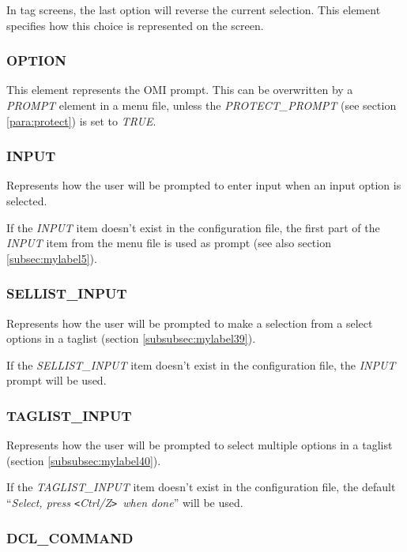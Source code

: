 \documentclass[a4paper]{book}
\newcommand{\lt}{\texttt{<}}
\newcommand{\gt}{\texttt{>}}
\begin{document}
In tag screens, the last option will reverse the current selection. This 
element specifies how this choice is represented on the screen.

\subsubsection{OPTION}
\label{para:option}

This element represents the OMI prompt. This can be overwritten by a 
\textsl{PROMPT} element in a menu file, unless the \textsl{PROTECT{\_}PROMPT} (see section 
\ref{para:protect}) is set to \textsl{TRUE}.

\subsubsection{INPUT}
\label{para:input}

Represents how the user will be prompted to enter input when an input option 
is selected.

If the \textsl{INPUT} item doesn't exist in the configuration file, the first part of the \textsl{INPUT}
item from the menu file is used as prompt (see also section \ref{subsec:mylabel5}).

\subsubsection{SELLIST{\_}INPUT}
\label{para:sellistinput}

Represents how the user will be prompted to make a selection from a select options in a taglist (section \ref{subsubsec:mylabel39}).

If the \textsl{SELLIST{\_}INPUT} item doesn't exist in the configuration file, the \textsl{INPUT} prompt will be used.

\subsubsection{TAGLIST{\_}INPUT}
\label{para:taglistinput}

Represents how the user will be prompted to select multiple options in a taglist (section \ref{subsubsec:mylabel40}).

If the \textsl{TAGLIST{\_}INPUT} item doesn't exist in the configuration file, the default ``\textsl{Select, press \lt Ctrl/Z\gt\ when done}'' will be used.


\subsubsection{DCL{\_}COMMAND}
\end{document}
